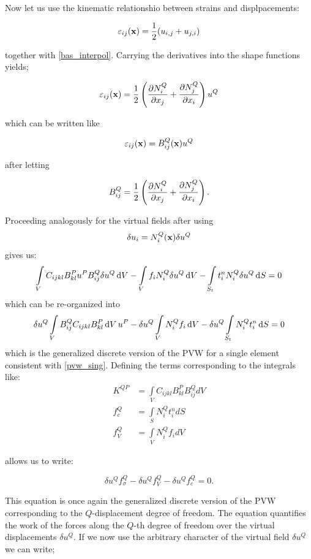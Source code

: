 Now let us use the kinematic relationshio between strains and displpacements:

\[ \varepsilon_{ij}(\vb x) = \frac{1}{2}( u_{i,j} + u_{j,i} ) \]

together with \cref{bas_interpol}. Carrying the derivatives into the shape functions yields;

\[ \varepsilon_{ij}(\vb x) = \frac{1}{2}\left(\pdv{N_i^Q}{x_j} + \pdv{N_j^Q}{x_i} \right){u^Q} \]

which can be written like

\begin{equation}
\varepsilon_{ij}(\vb x) = B_{ij}^Q(\vb x){u^Q}
\label{str-dis}
\end{equation}

after letting

\[ B_{ij}^Q = \frac{1}{2}\left(\pdv{N_i^Q}{x_j} + \pdv{N_j^Q}{x_i} \right). \]

Proceeding analogously for the virtual fields after using
\[ \delta {u_i} = N_i^Q(\vb x)\delta {u^Q} \]
gives us:
\[ \int\limits_V C_{ijkl} B_{kl}^P u^P B_{ij}^Q\delta u^Q \dd{V} - \int\limits_V f_i N_i^Q\delta {u^Q}\dd{V}  - \int\limits_{S_t} t_i^n N_i^Q\delta {u^Q} \dd{S} = 0 \]
which can be re-organized into
\[ \delta {u^Q}\int\limits_V B_{ij}^Q C_{ijkl} B_{kl}^P\dd{V}{u^P} - \delta {u^Q}\int\limits_V N_i^Q{f_i}\dd{V}  - \delta {u^Q}\int\limits_{S_t} N_i^Qt_i^n\dd{S} = 0\]
which is the generalized discrete version of the PVW for a single element consistent with \cref{pvw_sing}. Defining the terms corresponding to the integrals like:
\begin{equation}
\begin{aligned}
{K^{QP}} & = \int\limits_V {{C_{ijkl}}B_{kl}^PB_{ij}^QdV} \\
f_c^Q    & = \int\limits_S {N_i^Qt_i^ndS} \\
f_V^Q    & = \int\limits_V {N_i^Q{f_i}dV}
\label{Rigi_3}
\end{aligned}
\end{equation}


allows us to write:


\[ \delta u^Q f_\sigma ^Q - \delta {u^Q}f_V^Q - \delta u^Q f_c^Q = 0. \]

This equation is once again the generalized discrete version of the PVW corresponding to the $Q$-displacement degree of freedom. The equation quantifies the work of the forces along the $Q$-th degree of freedom over the virtual displacements $\delta u^Q$. If we now use the arbitrary character of the virtual field $\delta u^Q $ we can write;

